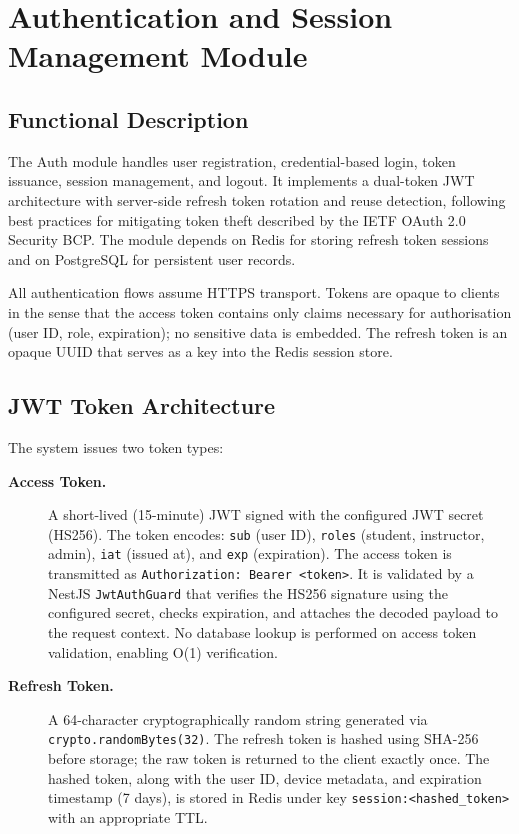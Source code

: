 
\section{Authentication and Session Management Module}
\label{sec:auth-module}

\subsection{Functional Description}

The Auth module handles user registration, credential-based login, token issuance, session management, and logout. It implements a dual-token JWT architecture with server-side refresh token rotation and reuse detection, following best practices for mitigating token theft described by the IETF OAuth 2.0 Security BCP. The module depends on Redis for storing refresh token sessions and on PostgreSQL for persistent user records.

All authentication flows assume HTTPS transport. Tokens are opaque to clients in the sense that the access token contains only claims necessary for authorisation (user ID, role, expiration); no sensitive data is embedded. The refresh token is an opaque UUID that serves as a key into the Redis session store.

\subsection{JWT Token Architecture}

The system issues two token types:

\begin{description}
  \item[\textbf{Access Token.}] A short-lived (15-minute) JWT signed with the configured JWT secret (HS256). The token encodes: \texttt{sub} (user ID), \texttt{roles} (student, instructor, admin), \texttt{iat} (issued at), and \texttt{exp} (expiration). The access token is transmitted as \texttt{Authorization: Bearer <token>}. It is validated by a NestJS \texttt{JwtAuthGuard} that verifies the HS256 signature using the configured secret, checks expiration, and attaches the decoded payload to the request context. No database lookup is performed on access token validation, enabling O(1) verification.
  \item[\textbf{Refresh Token.}] A 64-character cryptographically random string generated via \texttt{crypto.randomBytes(32)}. The refresh token is hashed using SHA-256 before storage; the raw token is returned to the client exactly once. The hashed token, along with the user ID, device metadata, and expiration timestamp (7 days), is stored in Redis under key \texttt{session:<hashed\_token>} with an appropriate TTL.
\end{description}

